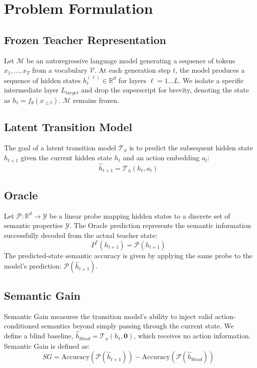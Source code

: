 \documentclass[conference]{IEEEtran}
\begin{document}
\section{Problem Formulation}

\subsection{Frozen Teacher Representation}
Let $\mathcal{M}$ be an autoregressive language model generating a sequence of tokens $x_1, \dots, x_T$ from a vocabulary $\mathcal{V}$. At each generation step $t$, the model produces a sequence of hidden states $h_t^{(\ell)} \in \mathbb{R}^d$ for layers $\ell = 1 \dots L$. We isolate a specific intermediate layer $L_{target}$ and drop the superscript for brevity, denoting the state as $h_t = f_\theta(x_{\le t})$. $\mathcal{M}$ remains frozen.

\subsection{Latent Transition Model}
The goal of a latent transition model $\mathcal{T}_\phi$ is to predict the subsequent hidden state $h_{t+1}$ given the current hidden state $h_t$ and an action embedding $a_t$:
\begin{equation}
\hat h_{t+1} = \mathcal{T}_\phi(h_t, a_t)
\end{equation}

\subsection{Oracle}
Let $\mathcal{P} : \mathbb{R}^d \rightarrow \mathcal{Y}$ be a linear probe mapping hidden states to a discrete set of semantic properties $\mathcal{Y}$. The Oracle prediction represents the semantic information successfully decoded from the actual teacher state:
\begin{equation}
P^*(h_{t+1}) = \mathcal{P}(h_{t+1})
\end{equation}
The predicted-state semantic accuracy is given by applying the same probe to the model's prediction: $\mathcal{P}(\hat h_{t+1})$.

\subsection{Semantic Gain}
Semantic Gain measures the transition model's ability to inject valid action-conditioned semantics beyond simply passing through the current state. We define a blind baseline, $\hat h_{blind} = \mathcal{T}_\phi(h_t, \mathbf{0})$, which receives no action information. Semantic Gain is defined as:
\begin{equation}
SG = \text{Accuracy}(\mathcal{P}(\hat h_{t+1})) - \text{Accuracy}(\mathcal{P}(\hat h_{blind}))
\end{equation}
\end{document}
